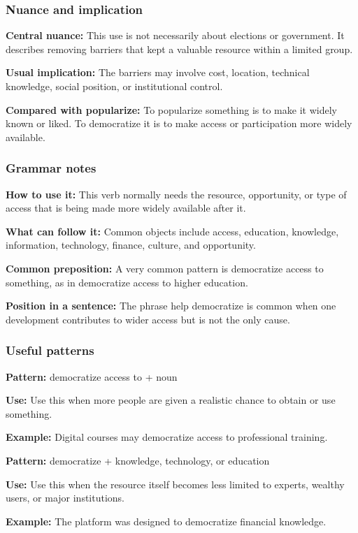 \documentclass[11pt]{article}
\begin{document}
\subsubsection{Nuance and implication}
\textbf{Central nuance:} This use is not necessarily about elections or government. It describes removing barriers that kept a valuable resource within a limited group.

\textbf{Usual implication:} The barriers may involve cost, location, technical knowledge, social position, or institutional control.

\textbf{Compared with popularize:} To popularize something is to make it widely known or liked. To democratize it is to make access or participation more widely available.

\subsubsection{Grammar notes}
\textbf{How to use it:} This verb normally needs the resource, opportunity, or type of access that is being made more widely available after it.

\textbf{What can follow it:} Common objects include access, education, knowledge, information, technology, finance, culture, and opportunity.

\textbf{Common preposition:} A very common pattern is democratize access to something, as in democratize access to higher education.

\textbf{Position in a sentence:} The phrase help democratize is common when one development contributes to wider access but is not the only cause.

\subsubsection{Useful patterns}
\textbf{Pattern:} democratize access to + noun

\textbf{Use:} Use this when more people are given a realistic chance to obtain or use something.

\textbf{Example:} Digital courses may democratize access to professional training.

\textbf{Pattern:} democratize + knowledge, technology, or education

\textbf{Use:} Use this when the resource itself becomes less limited to experts, wealthy users, or major institutions.

\textbf{Example:} The platform was designed to democratize financial knowledge.
\end{document}
